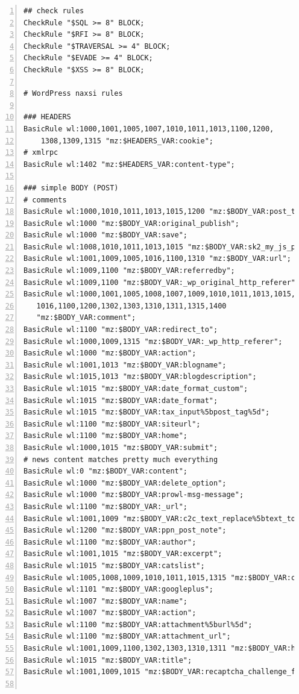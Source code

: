 \documentclass[Measurement results]{subfiles}
\begin{document}
\begin{lstlisting}[frame=single,caption=/etc/nginx/nbs.rules,backgroundcolor=\color{gray},breaklines=true,numbers=left,]
## check rules
CheckRule "$SQL >= 8" BLOCK;
CheckRule "$RFI >= 8" BLOCK;
CheckRule "$TRAVERSAL >= 4" BLOCK;
CheckRule "$EVADE >= 4" BLOCK;
CheckRule "$XSS >= 8" BLOCK;

# WordPress naxsi rules

### HEADERS
BasicRule wl:1000,1001,1005,1007,1010,1011,1013,1100,1200,
	1308,1309,1315 "mz:$HEADERS_VAR:cookie";
# xmlrpc
BasicRule wl:1402 "mz:$HEADERS_VAR:content-type";

### simple BODY (POST)
# comments
BasicRule wl:1000,1010,1011,1013,1015,1200 "mz:$BODY_VAR:post_title";
BasicRule wl:1000 "mz:$BODY_VAR:original_publish";
BasicRule wl:1000 "mz:$BODY_VAR:save";
BasicRule wl:1008,1010,1011,1013,1015 "mz:$BODY_VAR:sk2_my_js_payload";
BasicRule wl:1001,1009,1005,1016,1100,1310 "mz:$BODY_VAR:url";
BasicRule wl:1009,1100 "mz:$BODY_VAR:referredby";
BasicRule wl:1009,1100 "mz:$BODY_VAR:_wp_original_http_referer";
BasicRule wl:1000,1001,1005,1008,1007,1009,1010,1011,1013,1015,
   1016,1100,1200,1302,1303,1310,1311,1315,1400 
   "mz:$BODY_VAR:comment";
BasicRule wl:1100 "mz:$BODY_VAR:redirect_to";
BasicRule wl:1000,1009,1315 "mz:$BODY_VAR:_wp_http_referer";
BasicRule wl:1000 "mz:$BODY_VAR:action";
BasicRule wl:1001,1013 "mz:$BODY_VAR:blogname";
BasicRule wl:1015,1013 "mz:$BODY_VAR:blogdescription";
BasicRule wl:1015 "mz:$BODY_VAR:date_format_custom";
BasicRule wl:1015 "mz:$BODY_VAR:date_format";
BasicRule wl:1015 "mz:$BODY_VAR:tax_input%5bpost_tag%5d";
BasicRule wl:1100 "mz:$BODY_VAR:siteurl";
BasicRule wl:1100 "mz:$BODY_VAR:home";
BasicRule wl:1000,1015 "mz:$BODY_VAR:submit";
# news content matches pretty much everything
BasicRule wl:0 "mz:$BODY_VAR:content";
BasicRule wl:1000 "mz:$BODY_VAR:delete_option";
BasicRule wl:1000 "mz:$BODY_VAR:prowl-msg-message";
BasicRule wl:1100 "mz:$BODY_VAR:_url";
BasicRule wl:1001,1009 "mz:$BODY_VAR:c2c_text_replace%5btext_to_replace%5d";
BasicRule wl:1200 "mz:$BODY_VAR:ppn_post_note";
BasicRule wl:1100 "mz:$BODY_VAR:author";
BasicRule wl:1001,1015 "mz:$BODY_VAR:excerpt";
BasicRule wl:1015 "mz:$BODY_VAR:catslist";
BasicRule wl:1005,1008,1009,1010,1011,1015,1315 "mz:$BODY_VAR:cookie";
BasicRule wl:1101 "mz:$BODY_VAR:googleplus";
BasicRule wl:1007 "mz:$BODY_VAR:name";
BasicRule wl:1007 "mz:$BODY_VAR:action";
BasicRule wl:1100 "mz:$BODY_VAR:attachment%5burl%5d";
BasicRule wl:1100 "mz:$BODY_VAR:attachment_url";
BasicRule wl:1001,1009,1100,1302,1303,1310,1311 "mz:$BODY_VAR:html";
BasicRule wl:1015 "mz:$BODY_VAR:title";
BasicRule wl:1001,1009,1015 "mz:$BODY_VAR:recaptcha_challenge_field";


\end{lstlisting}
\end{document}

